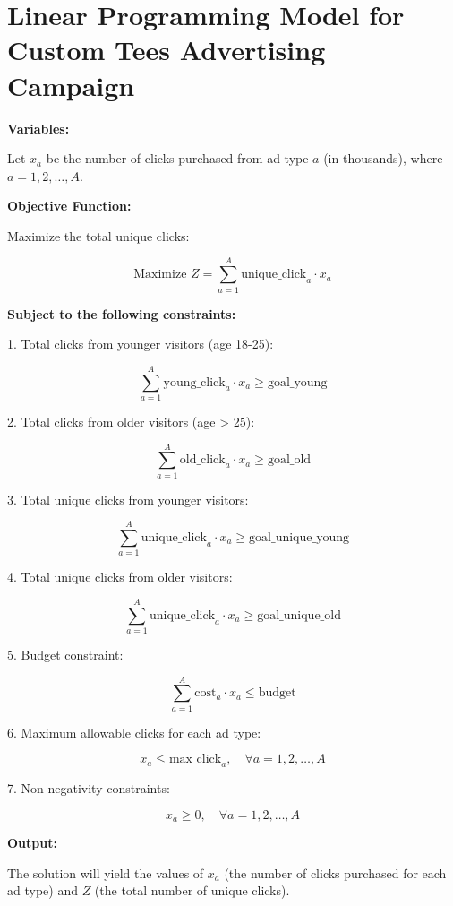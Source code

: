 \documentclass{article}
\begin{document}
\section*{Linear Programming Model for Custom Tees Advertising Campaign}

\textbf{Variables:}

Let \( x_a \) be the number of clicks purchased from ad type \( a \) (in thousands), where \( a = 1, 2, \ldots, A \).

\textbf{Objective Function:}

Maximize the total unique clicks:

\[
\text{Maximize } Z = \sum_{a=1}^{A} \text{unique\_click}_{a} \cdot x_a
\]

\textbf{Subject to the following constraints:}

1. Total clicks from younger visitors (age 18-25):

\[
\sum_{a=1}^{A} \text{young\_click}_{a} \cdot x_a \geq \text{goal\_young}
\]

2. Total clicks from older visitors (age > 25):

\[
\sum_{a=1}^{A} \text{old\_click}_{a} \cdot x_a \geq \text{goal\_old}
\]

3. Total unique clicks from younger visitors:

\[
\sum_{a=1}^{A} \text{unique\_click}_{a} \cdot x_a \geq \text{goal\_unique\_young}
\]

4. Total unique clicks from older visitors:

\[
\sum_{a=1}^{A} \text{unique\_click}_{a} \cdot x_a \geq \text{goal\_unique\_old}
\]

5. Budget constraint:

\[
\sum_{a=1}^{A} \text{cost}_{a} \cdot x_a \leq \text{budget}
\]

6. Maximum allowable clicks for each ad type:

\[
x_a \leq \text{max\_click}_{a}, \quad \forall a = 1, 2, \ldots, A
\]

7. Non-negativity constraints:

\[
x_a \geq 0, \quad \forall a = 1, 2, \ldots, A
\]

\textbf{Output:}

The solution will yield the values of \( x_a \) (the number of clicks purchased for each ad type) and \( Z \) (the total number of unique clicks).
\end{document}
